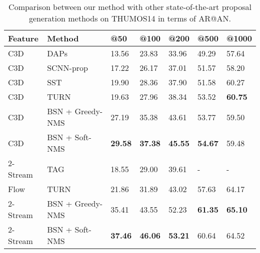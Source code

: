 \documentclass[runningheads]{llncs}
\begin{document}
\begin{table}[tbp]
\setlength{\abovecaptionskip}{-0.05cm} %
\setlength{\belowcaptionskip}{0.1cm} %
\centering
\caption{ Comparison between our method with other state-of-the-art  proposal generation methods on  THUMOS14 in terms of AR@AN.} %
\begin{tabular}{m{1.9cm}<{\centering}m{3.1cm}m{1.2cm}<{\centering}m{1.2cm}<{\centering}m{1.2cm}<{\centering}m{1.2cm}<{\centering}m{1.2cm}<{\centering}}
\toprule
Feature & Method  		& @50 & @100  & @200 & @500 & @1000    \\
\hline 
C3D & DAPs \cite{escorcia2016daps} 		& 13.56	& 23.83 &  33.96 & 49.29 & 57.64   \\
C3D & SCNN-prop \cite{shou2016action} 	& 17.22 & 26.17 &  37.01 & 51.57 & 58.20   \\
C3D & SST \cite{sst_buch_cvpr17}			& 19.90 & 28.36  &  37.90 & 51.58 & 60.27   \\
C3D & TURN \cite{gao2017turn} 			& 19.63 & 27.96 &  38.34 & 53.52 & {\bf 60.75}  \\
\hline 
C3D & BSN + Greedy-NMS 	& 27.19 & 35.38 &  43.61 &  53.77  & 59.50   \\
C3D & BSN + Soft-NMS	& {\bf 29.58} & {\bf 37.38} &  {\bf 45.55} & {\bf 54.67} & 59.48   \\
\hline 
\hline 
2-Stream & TAG \cite{zhao2017temporal} 		& 18.55 & 29.00  &  39.61 & - & -  \\
Flow & TURN \cite{gao2017turn} 		& 21.86 & 31.89 & 43.02 & 57.63  & 64.17  \\
\hline 
2-Stream & BSN + Greedy-NMS & 	 35.41 & 43.55 &  52.23 & {\bf 61.35} & {\bf 65.10 } \\
2-Stream & BSN + Soft-NMS & {\bf 37.46} & {\bf 46.06} &  {\bf 53.21} & 60.64 &  64.52   \\
\bottomrule
\end{tabular}
\label{table_comparison_2}
\vspace{-0.4cm}
\end{table}


\end{document}

